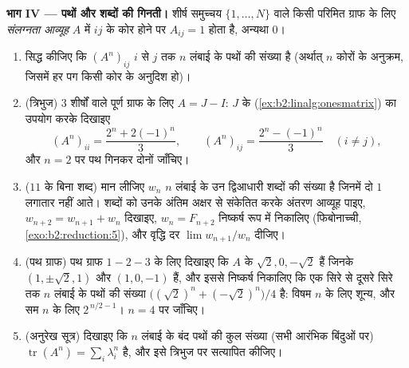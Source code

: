 \begin{problem}[{सप्ताहांत समस्या --- रैखिक पुनरावृत्तियों की
मूल प्रमेय}]
\medskip
\noindent\textbf{भाग IV --- पथों और शब्दों की गिनती।} शीर्ष समुच्चय
$\{1, \dots, N\}$ वाले किसी परिमित ग्राफ के लिए \emph{संलग्नता आव्यूह} $A$ में $ij$
के कोर होने पर $A_{ij} = 1$ होता है, अन्यथा $0$।
\begin{enumerate}[resume]
  \item सिद्ध कीजिए कि $(A^n)_{ij}$ $i$ से $j$ तक $n$ लंबाई के पथों की संख्या
        है (अर्थात् $n$ कोरों के अनुक्रम, जिसमें हर पग किसी कोर के
        अनुदिश हो)।
  \item (त्रिभुज) $3$ शीर्षों वाले पूर्ण ग्राफ के लिए $A = J - I$: $J$ के
         (\cref{ex:b2:linalg:onesmatrix}) का उपयोग करके दिखाइए
        \[
        (A^n)_{ii} = \frac{2^n + 2(-1)^n}{3},
        \qquad
        (A^n)_{ij} = \frac{2^n - (-1)^n}{3} \quad (i \neq j),
        \]
        और $n = 2$ पर पथ गिनकर दोनों जाँचिए।
  \item ($11$ के बिना शब्द) मान लीजिए $w_n$ $n$ लंबाई के उन
        द्विआधारी शब्दों की संख्या है जिनमें दो $1$ लगातार नहीं आते।
        शब्दों को उनके अंतिम अक्षर से संकेतित करके अंतरण आव्यूह पाइए,
        $w_{n+2} = w_{n+1} + w_n$ दिखाइए, $w_n =
        F_{n+2}$ निष्कर्ष रूप में निकालिए (फिबोनाच्ची, \cref{exo:b2:reduction:5}),
        और वृद्धि दर $\lim w_{n+1}/w_n$ दीजिए।
  \item (पथ ग्राफ) पथ ग्राफ $1 - 2 - 3$ के लिए दिखाइए कि $A$ के  $\sqrt2, 0, -\sqrt2$ हैं जिनके  $(1, \pm\sqrt2, 1)$ और $(1, 0, -1)$ हैं, और इससे
        निष्कर्ष निकालिए कि एक सिरे से दूसरे सिरे तक $n$ लंबाई के
        पथों की संख्या $\bigl((\sqrt2)^n + (-\sqrt2)^n\bigr)/4$ है: विषम $n$ के लिए शून्य, और सम $n$ के
        लिए $2^{\,n/2 - 1}$। $n = 4$ पर जाँचिए।
  \item (अनुरेख सूत्र) दिखाइए कि $n$ लंबाई के बंद पथों की कुल संख्या
        (सभी आरंभिक बिंदुओं पर) $\operatorname{tr}(A^n) = \sum_i \lambda_i^n$ है, और इसे त्रिभुज पर सत्यापित
        कीजिए।
\end{enumerate}


\end{problem}
